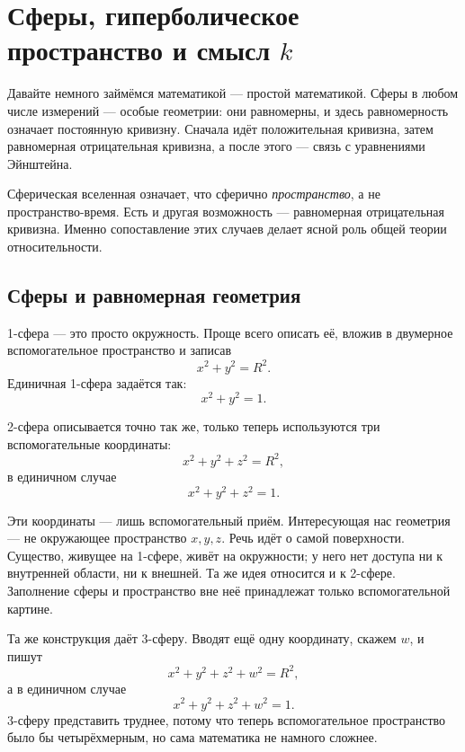 \chapter{Сферы, гиперболическое пространство и смысл \(k\)}

Давайте немного займёмся математикой — простой математикой. Сферы в любом числе измерений — особые геометрии: они равномерны, и здесь равномерность означает постоянную кривизну. Сначала идёт положительная кривизна, затем равномерная отрицательная кривизна, а после этого — связь с уравнениями Эйнштейна.

Сферическая вселенная означает, что сферично \emph{пространство}, а не пространство-время. Есть и другая возможность — равномерная отрицательная кривизна. Именно сопоставление этих случаев делает ясной роль общей теории относительности.

\section{Сферы и равномерная геометрия}

1-сфера — это просто окружность. Проще всего описать её, вложив в двумерное вспомогательное пространство и записав
\begin{equation}
x^2+y^2=R^2.
\end{equation}
Единичная 1-сфера задаётся так:
\begin{equation}
x^2+y^2=1.
\end{equation}

2-сфера описывается точно так же, только теперь используются три вспомогательные координаты:
\begin{equation}
x^2+y^2+z^2=R^2,
\end{equation}
в единичном случае
\begin{equation}
x^2+y^2+z^2=1.
\end{equation}

Эти координаты — лишь вспомогательный приём. Интересующая нас геометрия — не окружающее пространство \(x,y,z\). Речь идёт о самой поверхности. Существо, живущее на 1-сфере, живёт на окружности; у него нет доступа ни к внутренней области, ни к внешней. Та же идея относится и к 2-сфере. Заполнение сферы и пространство вне неё принадлежат только вспомогательной картине.

Та же конструкция даёт 3-сферу. Вводят ещё одну координату, скажем \(w\), и пишут
\begin{equation}
x^2+y^2+z^2+w^2=R^2,
\end{equation}
а в единичном случае
\begin{equation}
x^2+y^2+z^2+w^2=1.
\end{equation}
3-сферу представить труднее, потому что теперь вспомогательное пространство было бы четырёхмерным, но сама математика не намного сложнее.

